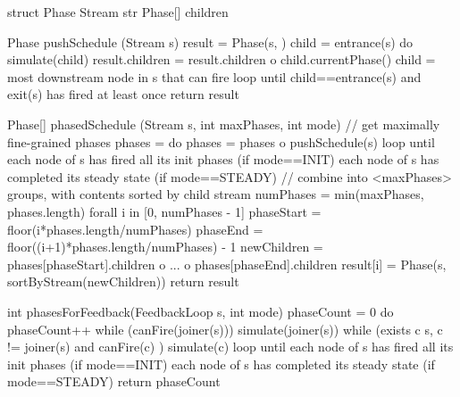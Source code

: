 struct Phase {
  Stream str
  Phase[] children
}

Phase pushSchedule (Stream s) {
  result = Phase(s, {})
  child = entrance(s)
  do {
    simulate(child)
    result.children = result.children o child.currentPhase()
    child = most downstream node in s that can fire
  } loop until child==entrance(s) and exit(s) has fired at least once
  return result
}

Phase[] phasedSchedule (Stream s, int maxPhases, int mode) {
  // get maximally fine-grained phases
  phases = {}
  do {
    phases = phases o pushSchedule(s)
  } loop until {each node of s has fired all its init phases    (if mode==INIT)
                each node of s has completed its steady state   (if mode==STEADY) }
  // combine into <maxPhases> groups, with contents sorted by child stream
  numPhases = min(maxPhases, phases.length)
  forall i in [0, numPhases - 1] {
    phaseStart = floor(i*phases.length/numPhases)
    phaseEnd = floor((i+1)*phases.length/numPhases) - 1
    newChildren = phases[phaseStart].children o ... o phases[phaseEnd].children
    result[i] = Phase(s, sortByStream(newChildren))
  }
  return result
}

int phasesForFeedback(FeedbackLoop s, int mode) {
  phaseCount = 0
  do {
    phaseCount++
    while (canFire(joiner(s)))
      simulate(joiner(s))
    while (exists c \in s, c != joiner(s) and canFire(c) )
      simulate(c)
  } loop until {each node of s has fired all its init phases    (if mode==INIT)
                each node of s has completed its steady state   (if mode==STEADY) }
  return phaseCount
}

